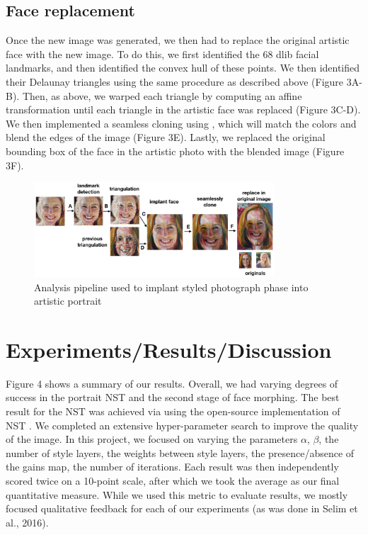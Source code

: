 \documentclass{article}
\begin{document}
\subsection{Face replacement}

Once the new image was generated, we then had to replace the original artistic face with the new image. To do this, we first identified the 68 dlib facial landmarks, and then identified the convex hull of these points. We then identified their Delaunay triangles using the same procedure as described above (Figure 3A-B). Then, as above, we warped each triangle by computing an affine transformation until each triangle in the artistic face was replaced (Figure 3C-D). We then implemented a seamless cloning using \cite{opencvImplement}, which will match the colors and blend the edges of the image (Figure 3E). Lastly, we replaced the original bounding box of the face in the artistic photo with the blended image (Figure 3F).  

\begin{figure}[H]
  \begin{center}
    \includegraphics[width=0.8\textwidth]{post_nst_pipeline2.jpg}
    \caption{Analysis pipeline used to implant styled photograph phase into artistic portrait} \label{fig:examples}
  \end{center}
\end{figure} 

\section{Experiments/Results/Discussion}

Figure 4 shows a summary of our results. Overall, we had varying degrees of success in the portrait NST and the second stage of face morphing. The best result for the NST was achieved via using the open-source implementation of NST \cite{NeuralStyleTranferGithub}. We completed an extensive hyper-parameter search to improve the quality of the image. In this project, we focused on varying the parameters $\alpha$, $\beta$, the number of style layers, the weights between style layers, the presence/absence of the gains map, the number of iterations. Each result was then independently scored twice on a 10-point scale, after which we took the average as our final quantitative measure. While we used this metric to evaluate results, we mostly focused qualitative feedback for each of our experiments (as was done in Selim et al., 2016).
\end{document}
